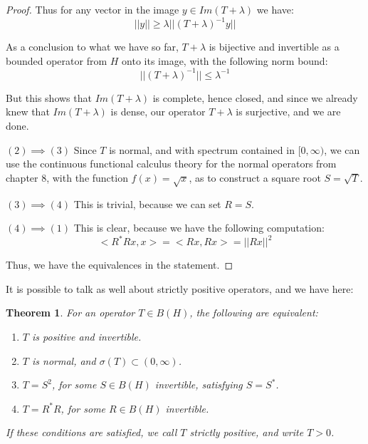 \documentclass[12pt]{amsbook}
\newtheorem{theorem}{Theorem}[chapter]
\begin{document}
\begin{proof}
Thus for any vector in the image $y\in Im(T+\lambda)$ we have:
$$||y||\geq\lambda\big|\big|(T+\lambda)^{-1}y\big|\big|$$

As a conclusion to what we have so far, $T+\lambda$ is bijective and invertible as a bounded operator from $H$ onto its image, with the following norm bound:
$$||(T+\lambda)^{-1}||\leq\lambda^{-1}$$

But this shows that $Im(T+\lambda)$ is complete, hence closed, and since we already knew that $Im(T+\lambda)$ is dense, our operator $T+\lambda$ is surjective, and we are done.

\medskip

$(2)\implies(3)$ Since $T$ is normal, and with spectrum contained in $[0,\infty)$, we can use the continuous functional calculus theory for the normal operators from chapter 8, with the function $f(x)=\sqrt{x}$, as to construct a square root $S=\sqrt{T}$. 

\medskip

$(3)\implies(4)$ This is trivial, because we can set $R=S$. 

\medskip

$(4)\implies(1)$ This is clear, because we have the following computation:
$$<R^*Rx,x>
=<Rx,Rx>
=||Rx||^2$$

Thus, we have the equivalences in the statement.
\end{proof}

It is possible to talk as well about strictly positive operators, and we have here:

\begin{theorem}
For an operator $T\in B(H)$, the following are equivalent:
\begin{enumerate}
\item $T$ is positive and invertible.

\item $T$ is normal, and $\sigma(T)\subset(0,\infty)$.

\item $T=S^2$, for some $S\in B(H)$ invertible, satisfying $S=S^*$.

\item $T=R^*R$, for some $R\in B(H)$ invertible.
\end{enumerate}
If these conditions are satisfied, we call $T$ strictly positive, and write $T>0$.
\end{theorem}
\end{document}

